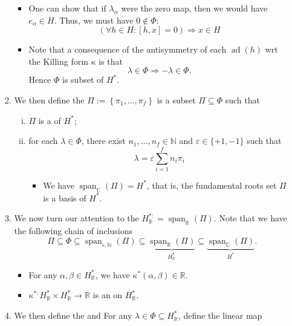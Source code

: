 \documentclass{article}
\begin{document}
\begin{enumerate}
\begin{enumerate}
\begin{itemize}
    \item One can show that if $\lambda_{\alpha}$ were the zero map, then we would have $e_{\alpha} \in H$. Thus, we must have $0 \notin \Phi$: 
    $$(\forall h \in H:[h, x]=0) \Rightarrow x \in H$$
    \item Note that a consequence of the antisymmetry of each $\operatorname{ad}(h)$ \gls{wrt} the Killing form $\kappa$ is that
$$
\lambda \in \Phi \Rightarrow-\lambda \in \Phi .
$$
Hence $\Phi$ is  subset of $H^{*}$.
\end{itemize}
\item We then define the  $\Pi:=\left\{\pi_{1}, \ldots, \pi_{f}\right\}$ is a subset $\Pi \subseteq \Phi$ such that 
\begin{enumerate}[i).]
    \item $\Pi$ is a  of $H^{*}$;
    \item for each $\lambda \in \Phi$, there exist $n_{1}, \ldots, n_{f} \in \mathbb{N}$ and $\varepsilon \in\{+1,-1\}$ such that
$$
\lambda=\varepsilon \sum_{i=1}^{f} n_{i} \pi_{i}
$$
\begin{itemize}
    \item We have $\operatorname{span}_{\mathbb{C}}(\Pi)=H^{*}$, that is, the {fundamental roots}  set $\Pi$ is a basis of $H^{*}$.
\end{itemize}
\end{enumerate}
\item We now turn our attention to the  $H_{\mathbb{R}}^{*:}=\operatorname{span}_{\mathbb{R}}(\Pi)$. Note that we have the following chain of inclusions
$$
\Pi \subseteq \Phi \subseteq \operatorname{span}_{\varepsilon, \mathbb{N}}(\Pi) \subseteq \underbrace{\operatorname{span}_{\mathbb{R}}(\Pi)}_{H_{\mathbb{R}}^{*}} \subseteq \underbrace{\operatorname{span}_{\mathbb{C}}(\Pi)}_{H^{*}} .
$$
\begin{itemize}
    \item For any $\alpha, \beta \in H_{\mathbb{R}}^{*}$, we have $\kappa^{*}(\alpha, \beta) \in \mathbb{R}$.
\item $\kappa^{*:} H_{\mathbb{R}}^{*} \times H_{\mathbb{R}}^{*} \rightarrow \mathbb{R}$ is an  on $H_{\mathbb{R}}^{*}$.
\end{itemize}
\item We then define the   and   For any $\lambda \in \Phi \subseteq H_{\mathbb{R}}^{*}$, define the linear map

\end{enumerate}
\end{enumerate}
\end{document}
